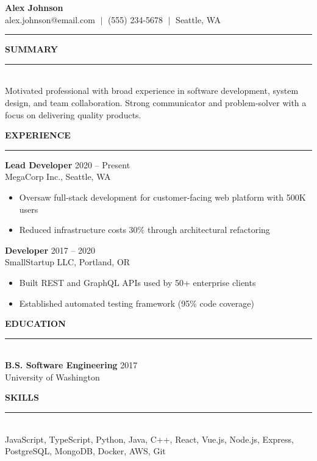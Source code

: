\documentclass[11pt,letterpaper]{article}
\begin{document}
\begin{center}
  {\LARGE\bfseries Alex Johnson}\\[3pt]
  alex.johnson@email.com $\;|\;$ (555) 234-5678 $\;|\;$ Seattle, WA
\end{center}
\noindent\rule{\linewidth}{0.4pt}

\bigskip
\noindent\textbf{SUMMARY}\\
\noindent\rule{\linewidth}{0.2pt}\\[4pt]
Motivated professional with broad experience in software development, system design, and team collaboration. Strong communicator and problem-solver with a focus on delivering quality products.

\bigskip
\noindent\textbf{EXPERIENCE}\\
\noindent\rule{\linewidth}{0.2pt}

\noindent\textbf{Lead Developer} \hfill 2020 -- Present\\
MegaCorp Inc., Seattle, WA
\begin{itemize}
  \item Oversaw full-stack development for customer-facing web platform with 500K users
  \item Reduced infrastructure costs 30\% through architectural refactoring
\end{itemize}

\noindent\textbf{Developer} \hfill 2017 -- 2020\\
SmallStartup LLC, Portland, OR
\begin{itemize}
  \item Built REST and GraphQL APIs used by 50+ enterprise clients
  \item Established automated testing framework (95\% code coverage)
\end{itemize}

\bigskip
\noindent\textbf{EDUCATION}\\
\noindent\rule{\linewidth}{0.2pt}\\[3pt]
\textbf{B.S. Software Engineering} \hfill 2017\\
University of Washington

\bigskip
\noindent\textbf{SKILLS}\\
\noindent\rule{\linewidth}{0.2pt}\\[3pt]
JavaScript, TypeScript, Python, Java, C++, React, Vue.js, Node.js, Express, PostgreSQL, MongoDB, Docker, AWS, Git
\end{document}
